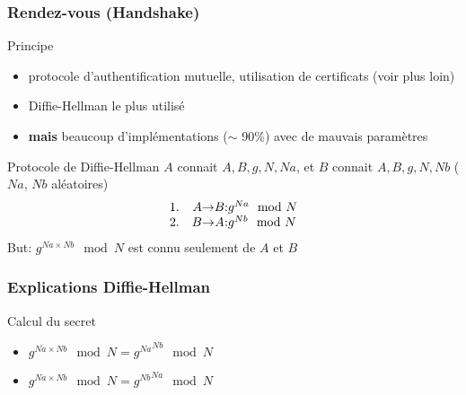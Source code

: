 \begin{reveals}
\begin{frame}[fragile]
\end{frame}

\begin{frame}
  \frametitle{Rendez-vous (Handshake)}

  \vfill

   \begin{block}{Principe}
     \begin{itemize}
     \item protocole d'authentification mutuelle, utilisation de
       certificats (voir plus loin)
     \item Diffie-Hellman le plus utilisé
     \item \textbf{mais} beaucoup d'implémentations (\(\sim\) 90\%)
       avec de mauvais paramètres
     \end{itemize}
  \end{block}

  \vfill
  \begin{block}{Protocole de Diffie-Hellman}
    \(A\) connait \(A,B,g,N,Na\), et \(B\) connait \(A,B,g,N,Nb\)
    (\(Na\), \(Nb\) aléatoires)
    \[
      \begin{array}{cr@{\ensuremath{\rightarrow}}c@{:}l}
        1.& A & B & g^{Na} \mod N \\
        2. & B & A & g^{Nb} \mod N\\
      \end{array}
    \]
    But: \(g^{Na\times Nb} \mod N\) est connu seulement de \(A\) et \(B\)
  \end{block}

  \vfill

\end{frame}

\begin{frame}
  \frametitle{Explications Diffie-Hellman}

  \vfill

   \begin{block}{Calcul du secret}
     \begin{itemize}
     \item \(g^{Na\times Nb} \mod N = {g^{Na}}^{Nb} \mod N\)
     \item \(g^{Na\times Nb} \mod N = {g^{Nb}}^{Na} \mod N\)
     \end{itemize}
  \end{block}

  \vfill


\end{frame}
\end{reveals}
